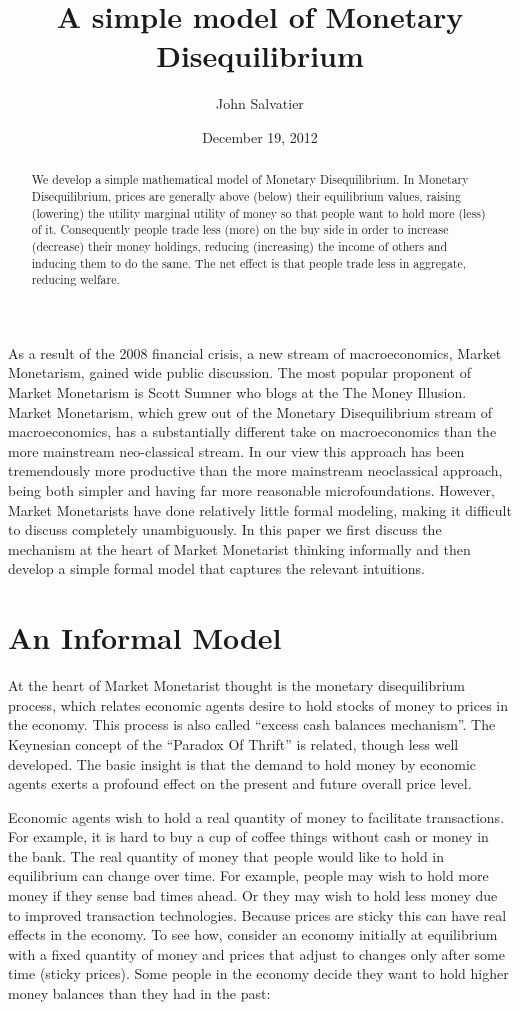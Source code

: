 \documentclass[14pt]{article} \usepackage{amsmath}
\title{A simple model of Monetary Disequilibrium}
\author{John Salvatier}
\date{December 19, 2012}
\begin{document}
\maketitle

\begin{abstract}
We develop a simple mathematical model of Monetary Disequilibrium. In Monetary Disequilibrium, prices are generally above (below) their equilibrium values, raising (lowering) the utility marginal utility of money so that people want to hold more (less) of it. 
Consequently people trade less (more) on the buy side in order to increase (decrease) their money holdings, reducing (increasing) the income of others and inducing them to do the same.
The net effect is that people trade less in aggregate, reducing welfare.
\end{abstract}

As a result of the 2008 financial crisis, a new stream of macroeconomics, Market Monetarism, gained wide public discussion. The most popular proponent of Market Monetarism is Scott Sumner who blogs at the The Money Illusion. Market Monetarism, which grew out of the Monetary Disequilibrium stream of macroeconomics, has a substantially different take on macroeconomics than the more mainstream neo-classical stream. In our view this approach has been tremendously more productive than the more mainstream neoclassical approach, being both simpler and having far more reasonable microfoundations. However, Market Monetarists have done relatively little formal modeling, making it difficult to discuss completely unambiguously. In this paper we first discuss the mechanism at the heart of Market Monetarist thinking informally and then develop a simple formal model that captures the relevant intuitions.

\section{An Informal Model}
At the heart of Market Monetarist thought is the monetary disequilibrium process, which relates economic agents desire to hold stocks of money to prices in the economy. This process is also called ``excess cash balances mechanism''. The Keynesian concept of the ``Paradox Of Thrift'' is related, though less well developed. The basic insight is that the demand to hold money by economic agents exerts a profound effect on the present and future overall price level.

Economic agents wish to hold a real quantity of money to facilitate transactions. For example, it is hard to buy a cup of coffee things without cash or money in the bank. The real quantity of money that people would like to hold in equilibrium can change over time. For example, people may wish to hold more money if they sense bad times ahead. Or they may wish to hold less money due to improved transaction technologies. Because prices are sticky this can have real effects in the economy. To see how, consider an economy initially at equilibrium with a fixed quantity of money and prices that adjust to changes only after some time (sticky prices). Some people in the economy decide they want to hold higher money balances than they had in the past:
\end{document}
